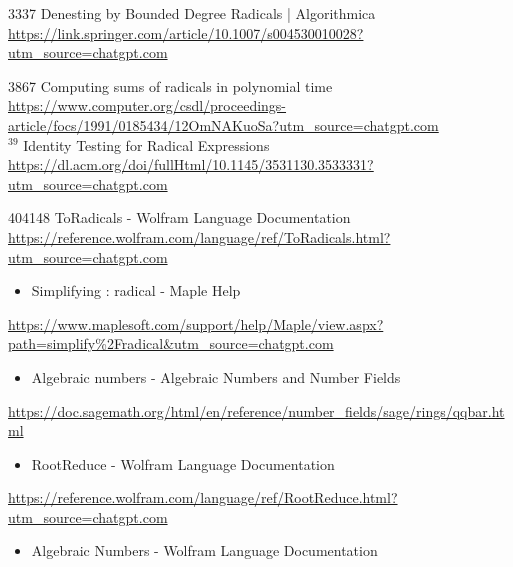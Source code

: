 \documentclass[10pt]{article}
\begin{document}
3337 Denesting by Bounded Degree Radicals | Algorithmica \href{https://link.springer.com/article/10.1007/s004530010028?utm_source=chatgpt.com}{https://link.springer.com/article/10.1007/s004530010028?utm\_source=chatgpt.com}

3867 Computing sums of radicals in polynomial time \href{https://www.computer.org/csdl/proceedings-article/focs/1991/0185434/12OmNAKuoSa?utm_source=chatgpt.com}{https://www.computer.org/csdl/proceedings-article/focs/1991/0185434/12OmNAKuoSa?utm\_source=chatgpt.com}\\
${ }^{39}$ Identity Testing for Radical Expressions \href{https://dl.acm.org/doi/fullHtml/10.1145/3531130.3533331?utm_source=chatgpt.com}{https://dl.acm.org/doi/fullHtml/10.1145/3531130.3533331?utm\_source=chatgpt.com}

404148 ToRadicals - Wolfram Language Documentation \href{https://reference.wolfram.com/language/ref/ToRadicals.html?utm_source=chatgpt.com}{https://reference.wolfram.com/language/ref/ToRadicals.html?utm\_source=chatgpt.com}

\begin{itemize}
  \item[4249] Simplifying : radical - Maple Help
\end{itemize}

\href{https://www.maplesoft.com/support/help/Maple/view.aspx?path=simplify%2Fradical&utm_source=chatgpt.com}{https://www.maplesoft.com/support/help/Maple/view.aspx?path=simplify\%2Fradical\&utm\_source=chatgpt.com}

\begin{itemize}
  \item[435354] Algebraic numbers - Algebraic Numbers and Number Fields
\end{itemize}

\href{https://doc.sagemath.org/html/en/reference/number_fields/sage/rings/qqbar.html}{https://doc.sagemath.org/html/en/reference/number\_fields/sage/rings/qqbar.html}

\begin{itemize}
  \item[46] RootReduce - Wolfram Language Documentation
\end{itemize}

\href{https://reference.wolfram.com/language/ref/RootReduce.html?utm_source=chatgpt.com}{https://reference.wolfram.com/language/ref/RootReduce.html?utm\_source=chatgpt.com}

\begin{itemize}
  \item[47] Algebraic Numbers - Wolfram Language Documentation
\end{itemize}
\end{document}
